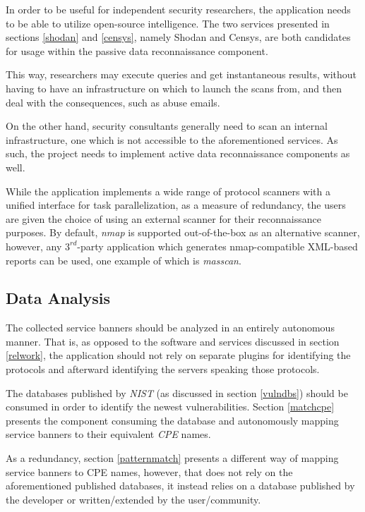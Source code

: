 \documentclass[a4paper,12pt]{article}
\begin{document}
	In order to be useful for independent security researchers, the application needs to be able to utilize open-source intelligence. The two services presented in sections \ref{shodan} and \ref{censys}, namely Shodan\cite{shodan16} and Censys\cite{censys15}, are both candidates for usage within the passive data reconnaissance component.
	
	This way, researchers may execute queries and get instantaneous results, without having to have an infrastructure on which to launch the scans from, and then deal with the consequences, such as abuse emails.
	
	On the other hand, security consultants generally need to scan an internal infrastructure, one which is not accessible to the aforementioned services. As such, the project needs to implement active data reconnaissance components as well.
	
	While the application implements a wide range of protocol scanners with a unified interface for task parallelization, as a measure of redundancy, the users are given the choice of using an external scanner for their reconnaissance purposes. By default, \textit{nmap} is supported out-of-the-box as an alternative scanner, however, any $3^{rd}$-party application which generates nmap-compatible XML-based reports can be used, one example of which is \textit{masscan}.
		
\subsection{Data Analysis}
 
	
	The collected service banners should be analyzed in an entirely autonomous manner. That is, as opposed to the software and services discussed in section \ref{relwork}, the application should not rely on separate plugins for identifying the protocols and afterward identifying the servers speaking those protocols.
	
	The databases published by \textit{NIST} (as discussed in section \ref{vulndbs}) should be consumed in order to identify the newest vulnerabilities. Section \ref{matchcpe} presents the component consuming the database and autonomously mapping service banners to their equivalent \textit{CPE} names.
	
	As a redundancy, section \ref{patternmatch} presents a different way of mapping service banners to CPE names, however, that does not rely on the aforementioned published databases, it instead relies on a database published by the developer or written/extended by the user/community.
			
\end{document}
